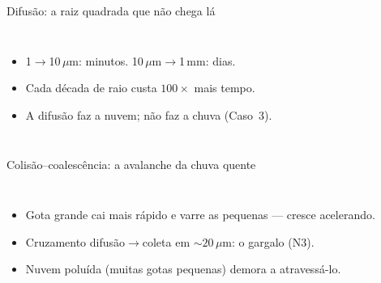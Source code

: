 \documentclass[aspectratio=169,11pt]{beamer}
\begin{document}
\begin{frame}{Difusão: a raiz quadrada que não chega lá}
  \begin{columns}
    \vspace{0.4em}
    \begin{itemize}
      \item 1$\to$10\,$\mu$m: minutos. 10\,$\mu$m$\to$1\,mm:
            \alert{dias}.
      \item Cada década de raio custa $100\times$ mais tempo.
      \item A difusão faz a nuvem; \alert{não} faz a chuva (Caso~3).
    \end{itemize}
  \end{columns}
\end{frame}

\begin{frame}{Colisão--coalescência: a avalanche da chuva quente}
  \begin{columns}
    \vspace{0.4em}
    \begin{itemize}
      \item Gota grande cai mais rápido e varre as pequenas — cresce
            \alert{acelerando}.
      \item Cruzamento difusão$\to$coleta em $\sim20\,\mu$m: o gargalo
            (N3).
      \item Nuvem poluída (muitas gotas pequenas) demora a
            atravessá-lo.
    \end{itemize}
  \end{columns}
\end{frame}
\end{document}
